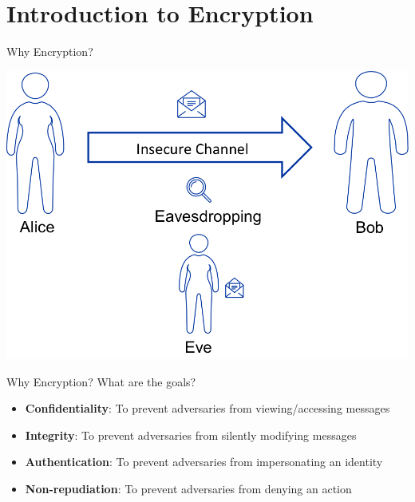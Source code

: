\documentclass[aspectratio=169]{beamer}
\begin{document}
%
%
%

\section{Introduction to Encryption}
\frame{\sectionpage}

\begin{frame}{Why Encryption?}
\begin{center}
	\includegraphics[width=0.7\linewidth]{insecure-channel.png}
\end{center}
\end{frame}

\begin{frame}{Why Encryption?}
What are the goals? 
\begin{itemize}
  \item \textbf{Confidentiality}: To prevent adversaries from viewing/accessing messages
  \item \textbf{Integrity}: To prevent adversaries from silently modifying messages
  \item \textbf{Authentication}: To prevent adversaries from impersonating an identity
  \item \textbf{Non-repudiation}: To prevent adversaries from denying an action
\end{itemize}
\end{frame}
\end{document}
